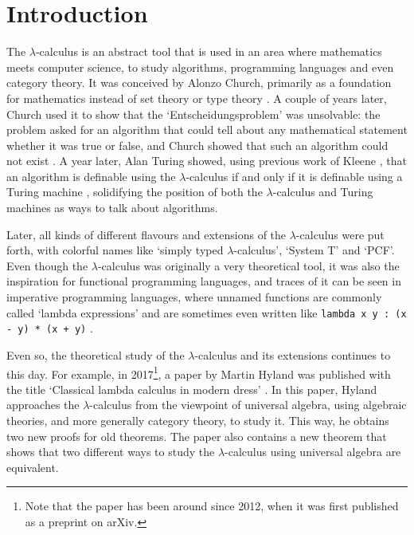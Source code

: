 \chapter{Introduction}

The $ \lambda $-calculus is an abstract tool that is used in an area where mathematics meets computer science, to study algorithms, programming languages and even category theory. It was conceived by Alonzo Church, primarily as a foundation for mathematics instead of set theory or type theory \autocite{church-lambda-calculus}. A couple of years later, Church used it to show that the `Entscheidungsproblem' was unsolvable: the problem asked for an algorithm that could tell about any mathematical statement whether it was true or false, and Church showed that such an algorithm could not exist \autocite{church-number-theory}. A year later, Alan Turing showed, using previous work of Kleene \autocite{kleene-lambda}, that an algorithm is definable using the $ \lambda $-calculus if and only if it is definable using a Turing machine \autocite{turing-lambda}, solidifying the position of both the $ \lambda $-calculus and Turing machines as ways to talk about algorithms.

Later, all kinds of different flavours and extensions of the $ \lambda $-calculus were put forth, with colorful names like `simply typed $ \lambda $-calculus', `System T' and `PCF'. Even though the $ \lambda $-calculus was originally a very theoretical tool, it was also the inspiration for functional programming languages, and traces of it can be seen in imperative programming languages, where unnamed functions are commonly called `lambda expressions' \autocite{java-lambdas} and are sometimes even written like \texttt{lambda x y : (x - y) * (x + y)} \autocite{python-expressions}.

Even so, the theoretical study of the $ \lambda $-calculus and its extensions continues to this day. For example, in 2017\footnote{Note that the paper has been around since 2012, when it was first published as a preprint on arXiv.}, a paper by Martin Hyland was published with the title `Classical lambda calculus in modern dress' \autocite{Hyland}. In this paper, Hyland approaches the $ \lambda $-calculus from the viewpoint of universal algebra, using algebraic theories, and more generally category theory, to study it. This way, he obtains two new proofs for old theorems. The paper also contains a new theorem that shows that two different ways to study the $ \lambda $-calculus using universal algebra are equivalent.

